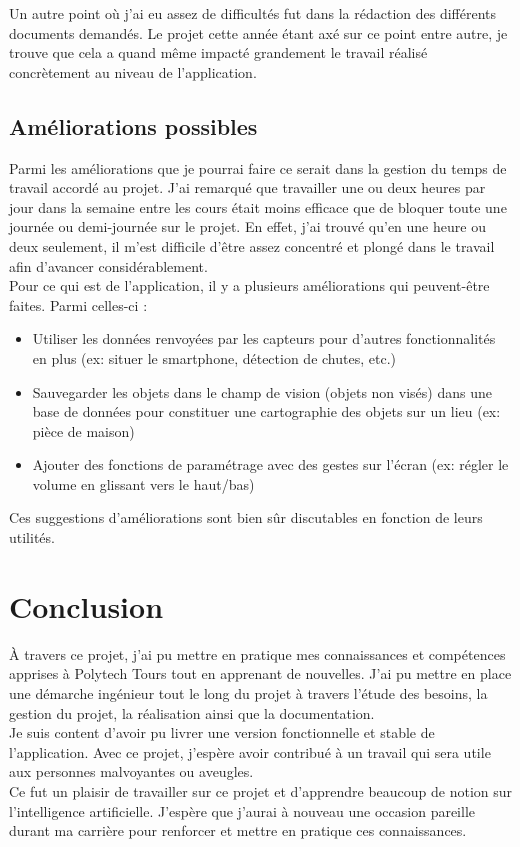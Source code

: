 \documentclass[UTF8]{EPURapport}
\begin{document}
Un autre point où j'ai eu assez de difficultés fut dans la rédaction des différents documents demandés. Le projet cette année étant axé sur ce point entre autre, je trouve que cela a quand même impacté grandement le travail réalisé concrètement au niveau de l'application.

\section{Améliorations possibles}

Parmi les améliorations que je pourrai faire ce serait dans la gestion du temps de travail accordé au projet. J'ai remarqué que travailler une ou deux heures par jour dans la semaine entre les cours était moins efficace que de bloquer toute une journée ou demi-journée sur le projet. En effet, j'ai trouvé qu'en une heure ou deux seulement, il m'est difficile d'être assez concentré et plongé dans le travail afin d'avancer considérablement.\\

Pour ce qui est de l'application, il y a plusieurs améliorations qui peuvent-être faites. Parmi celles-ci :\\

\begin{itemize}
  \item Utiliser les données renvoyées par les capteurs pour d'autres fonctionnalités en plus (ex: situer le smartphone, détection de chutes, etc.)
  \item Sauvegarder les objets dans le champ de vision (objets non visés) dans une base de données pour constituer une cartographie des objets sur un lieu (ex: pièce de maison)
  \item Ajouter des fonctions de paramétrage avec des gestes sur l'écran (ex: régler le volume en glissant vers le haut/bas)\\
\end{itemize}

Ces suggestions d'améliorations sont bien sûr discutables en fonction de leurs utilités.

\chapter{Conclusion}

À travers ce projet, j'ai pu mettre en pratique mes connaissances et compétences apprises à Polytech Tours tout en apprenant de nouvelles. J'ai pu mettre en place une démarche ingénieur tout le long du projet à travers l'étude des besoins, la gestion du projet, la réalisation ainsi que la documentation. \\

Je suis content d'avoir pu livrer une version fonctionnelle et stable de l'application. Avec ce projet, j'espère avoir contribué à un travail qui sera utile aux personnes malvoyantes ou aveugles.\\

Ce fut un plaisir de travailler sur ce projet et d'apprendre beaucoup de notion sur l'intelligence artificielle. J'espère que j'aurai à nouveau une occasion pareille durant ma carrière pour renforcer et mettre en pratique ces connaissances.

\annexes
\end{document}
